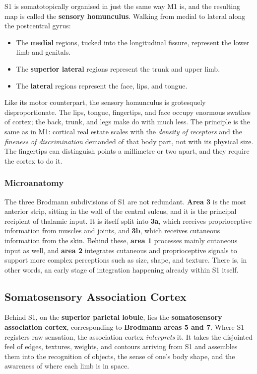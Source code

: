 \documentclass[11pt]{article}
\begin{document}
S1 is somatotopically organised in just the same way M1 is, and the resulting map is called the \textbf{sensory homunculus}. Walking from medial to lateral along the postcentral gyrus:

\begin{itemize}
    \item The \textbf{medial} regions, tucked into the longitudinal fissure, represent the lower limb and genitals.
    \item The \textbf{superior lateral} regions represent the trunk and upper limb.
    \item The \textbf{lateral} regions represent the face, lips, and tongue.
\end{itemize}

Like its motor counterpart, the sensory homunculus is grotesquely disproportionate. The lips, tongue, fingertips, and face occupy enormous swathes of cortex; the back, trunk, and legs make do with much less. The principle is the same as in M1: cortical real estate scales with the \textit{density of receptors} and the \textit{fineness of discrimination} demanded of that body part, not with its physical size. The fingertips can distinguish points a millimetre or two apart, and they require the cortex to do it.

\subsubsection{Microanatomy}

The three Brodmann subdivisions of S1 are not redundant. \textbf{Area 3} is the most anterior strip, sitting in the wall of the central sulcus, and it is the principal recipient of thalamic input. It is itself split into \textbf{3a}, which receives proprioceptive information from muscles and joints, and \textbf{3b}, which receives cutaneous information from the skin. Behind these, \textbf{area 1} processes mainly cutaneous input as well, and \textbf{area 2} integrates cutaneous and proprioceptive signals to support more complex perceptions such as size, shape, and texture. There is, in other words, an early stage of integration happening already within S1 itself.

\subsection{Somatosensory Association Cortex}

Behind S1, on the \textbf{superior parietal lobule}, lies the \textbf{somatosensory association cortex}, corresponding to \textbf{Brodmann areas 5 and 7}. Where S1 registers raw sensation, the association cortex \textit{interprets} it. It takes the disjointed feel of edges, textures, weights, and contours arriving from S1 and assembles them into the recognition of objects, the sense of one's body shape, and the awareness of where each limb is in space.
\end{document}
